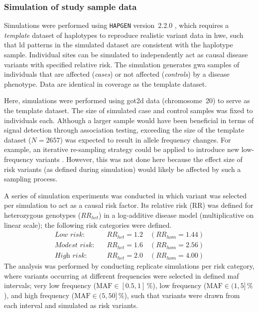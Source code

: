 %
\subsubsection{Simulation of study sample data}
%

Simulations were performed using \texttt{HAPGEN} version~2.2.0 \citep{Su:2011km}, which requires a \emph{template} dataset of haplotypes to reproduce realistic variant data in \gls{hwe}, such that \gls{ld} patterns in the simulated dataset are consistent with the haplotype sample.
Individual sites can be simulated to independently act as causal disease variants with specified relative risk.
The simulation generates  \gls{gwa} samples of individuals that are affected (\emph{cases}) or not affected (\emph{controls}) by a disease phenotype.
Data are identical in coverage as the template dataset.

Here, simulations were performed using \gls{got2d} data (chromosome~20) to serve as the template dataset.
The size of simulated case and control samples was fixed to  individuals each.
Although a larger sample would have been beneficial in terms of signal detection through association testing, exceeding the size of the template dataset (${N=\num{2657}}$) was expected to result in  allele frequency changes.
For example, an iterative re-sampling strategy could be applied to introduce new low-frequency variants \citep[\eg following][]{Moutsianas:2015jm}.
However, this was not done here because the effect size of risk variants (as defined during simulation) would likely be affected by such a sampling process.

A series of simulation experiments was conducted in which  variant was selected per simulation to act as a causal risk factor.
Its relative risk (RR) was defined for heterozygous genotypes ($RR_{het}$) in a log-additive disease model (\ie multiplicative on linear scale); the following  risk categories were defined.
\begin{align*}
	\textit{Low risk}     : & \quad {RR_{het}=1.2} \quad {(RR_{hom}=1.44)} \\
	\textit{Modest risk}  : & \quad {RR_{het}=1.6} \quad {(RR_{hom}=2.56)} \\
	\textit{High risk}    : & \quad {RR_{het}=2.0} \quad {(RR_{hom}=4.00)}
\end{align*}
The analysis was performed by conducting  replicate simulations per risk category, where variants occurring at different frequencies were selected in  defined \gls{maf} intervals;
very low frequency (${\text{MAF} \in [0.5, 1]\,\%}$), low frequency (${\text{MAF} \in (1, 5]\,\%}$), and high frequency (${\text{MAF} \in (5, 50]\,\%}$), such that  variants were drawn from each interval and simulated as risk variants.

